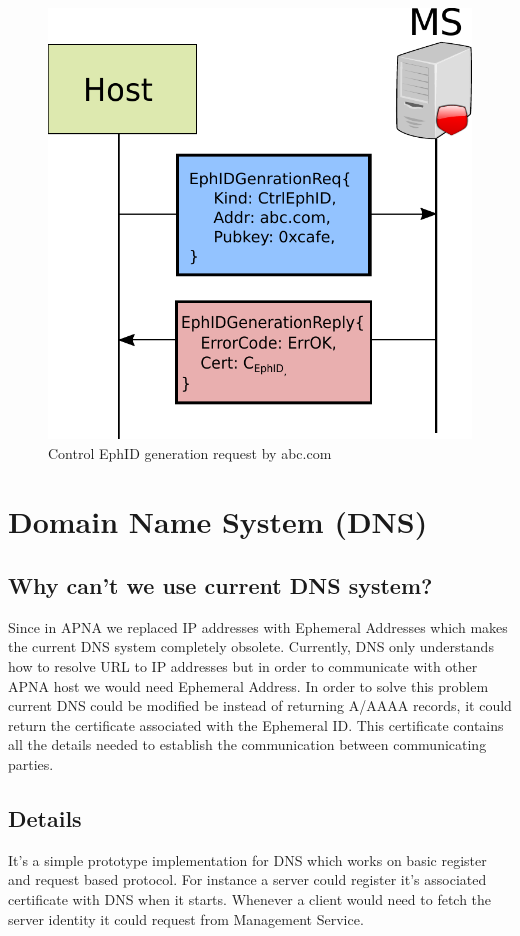 \begin{figure}[th]
\centering
\includegraphics[scale=0.6]{Figures/ephid_gen.pdf}
\decoRule
\caption[EphID Generation Request]{Control EphID generation request by abc.com}
\label{fig:ephid_gen}
\end{figure}

\section{Domain Name System (DNS)}
\subsection{Why can't we use current DNS system?}
Since in APNA we replaced IP addresses with Ephemeral Addresses which makes the current DNS system completely obsolete. Currently, DNS only understands how to resolve URL to IP addresses but in order to communicate with other APNA host we would need Ephemeral Address. In order to solve this problem current DNS could be modified be instead of returning A/AAAA records, it could return the certificate associated with the Ephemeral ID. This certificate contains all the details needed to establish the communication between communicating parties.

\subsection{Details}
It's a simple prototype implementation for DNS which works on basic register and request based protocol. For instance a server could register it's associated certificate with DNS when it starts. Whenever a client would need to fetch the server identity it could request from Management Service.

